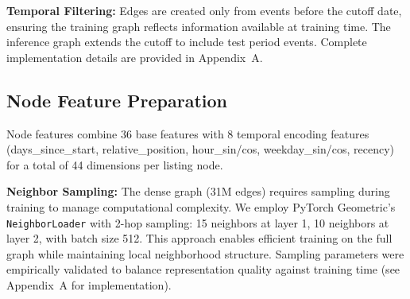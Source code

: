 \textbf{Temporal Filtering:} Edges are created only from events before the cutoff date, ensuring the training graph reflects information available at training time. The inference graph extends the cutoff to include test period events. Complete implementation details are provided in Appendix~A.

\subsection{Node Feature Preparation}
\label{sec:4_5_2}

Node features combine 36 base features with 8 temporal encoding features (days\_since\_start, relative\_position, hour\_sin/cos, weekday\_sin/cos, recency) for a total of 44 dimensions per listing node.

\textbf{Neighbor Sampling:} The dense graph (31M edges) requires sampling during training to manage computational complexity. We employ PyTorch Geometric's \texttt{NeighborLoader} with 2-hop sampling: 15 neighbors at layer 1, 10 neighbors at layer 2, with batch size 512. This approach enables efficient training on the full graph while maintaining local neighborhood structure. Sampling parameters were empirically validated to balance representation quality against training time (see Appendix~A for implementation).
